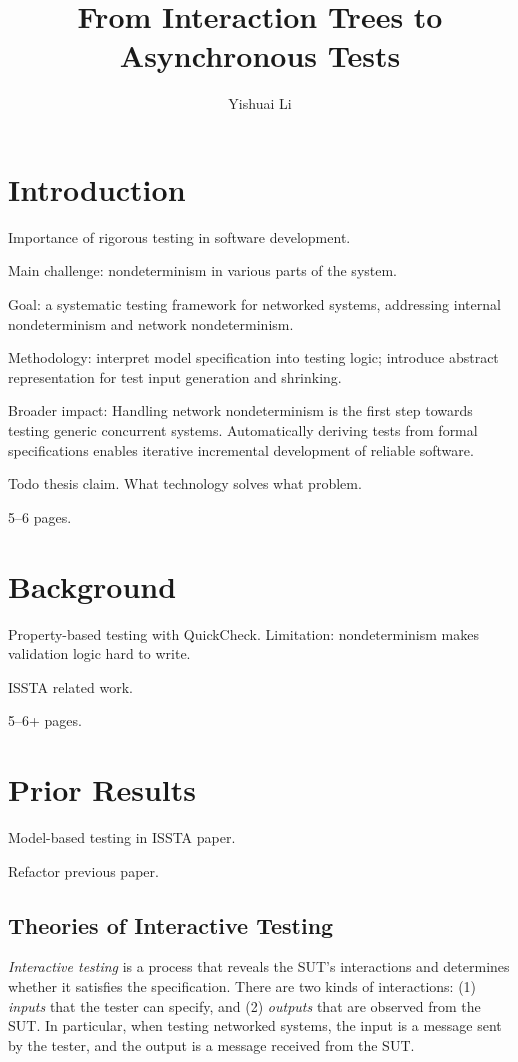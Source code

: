 \documentclass{article}
\title{From Interaction Trees to Asynchronous Tests}
\author{Yishuai Li}
\theoremstyle{definition}
\begin{document}
\maketitle
\section{Introduction}
Importance of rigorous testing in software development.

Main challenge: nondeterminism in various parts of the system.

Goal: a systematic testing framework for networked systems, addressing internal
nondeterminism and network nondeterminism.

Methodology: interpret model specification into testing logic; introduce
abstract representation for test input generation and shrinking.

Broader impact: Handling network nondeterminism is the first step towards
testing generic concurrent systems.  Automatically deriving tests from formal
specifications enables iterative incremental development of reliable software.

Todo thesis claim.  What technology solves what problem.

5--6 pages.

\section{Background}
Property-based testing with QuickCheck.  Limitation: nondeterminism makes
validation logic hard to write.

ISSTA related work.

5--6+ pages.

\section{Prior Results}
Model-based testing in ISSTA paper.

Refactor previous paper.

\subsection{Theories of Interactive Testing}
{\em Interactive testing} is a process that reveals the SUT's interactions and
determines whether it satisfies the specification.  There are two kinds of
interactions: (1) {\em inputs} that the tester can specify, and (2) {\em
  outputs} that are observed from the SUT.  In particular, when testing
networked systems, the input is a message sent by the tester, and the output is
a message received from the SUT.
\end{document}
